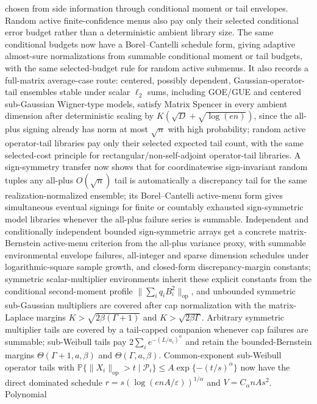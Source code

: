 \documentclass[11pt]{article}
\begin{document}
chosen from side information through conditional moment or tail envelopes.
Random active finite-confidence menus also pay only their selected conditional
error budget rather than a deterministic ambient library size.  The same
conditional budgets now have a Borel--Cantelli schedule form, giving adaptive
almost-sure normalizations from summable conditional moment or tail budgets,
with the same selected-budget rule for random active submenus.  It also
records a full-matrix average-case route: centered, possibly dependent,
Gaussian-operator-tail ensembles stable under scalar \(\ell_2\) sums, including
GOE/GUE and centered sub-Gaussian Wigner-type models, satisfy Matrix Spencer in
every ambient dimension after deterministic scaling by
\(K(\sqrt D+\sqrt{\log(en)})\), since the all-plus signing already has norm at
most \(\sqrt n\) with high probability; random active operator-tail libraries
pay only their selected expected tail count, with the same selected-cost
principle for rectangular/non-self-adjoint operator-tail libraries.  A sign-symmetry transfer now shows
that for coordinatewise sign-invariant random tuples any all-plus
\(O(\sqrt n)\) tail is automatically a discrepancy tail for the same
realization-normalized ensemble; its Borel--Cantelli active-menu form gives
simultaneous eventual signings for finite or countably exhausted
sign-symmetric model libraries whenever the all-plus failure series is
summable.  Independent and conditionally independent bounded sign-symmetric
arrays get a concrete matrix-Bernstein active-menu criterion from the all-plus
variance proxy, with summable environmental envelope failures, all-integer and
sparse dimension schedules under logarithmic-square sample growth, and
closed-form discrepancy-margin constants; symmetric scalar-multiplier
environments inherit these explicit constants from the conditional
second-moment profile \(\|\sum_iq_iB_i^2\|_{\mathrm{op}}\), and unbounded
symmetric sub-Gaussian multipliers are covered after cap normalization with the
matrix-Laplace margins \(K>\sqrt{2\beta(\Gamma+1)}\) and
\(K>\sqrt{2\beta\Gamma}\).  Arbitrary symmetric multiplier tails are covered by
a tail-capped companion whenever cap failures are summable; sub-Weibull tails
pay \(2\sum_i e^{-(L/a_i)^\alpha}\) and retain the bounded-Bernstein margins
\(\Theta(\Gamma+1,a,\beta)\) and \(\Theta(\Gamma,a,\beta)\).  Common-exponent
sub-Weibull operator tails with
\(\mathbb P\{\|X_i\|_{\mathrm{op}}>t\mid\mathcal P_i\}\le
A\exp\{-(t/s)^\alpha\}\) now have the direct dominated schedule
\(r=s(\log(e nA/\varepsilon))^{1/\alpha}\) and
\(V=C_\alpha nAs^2\).  Polynomial
\end{document}
